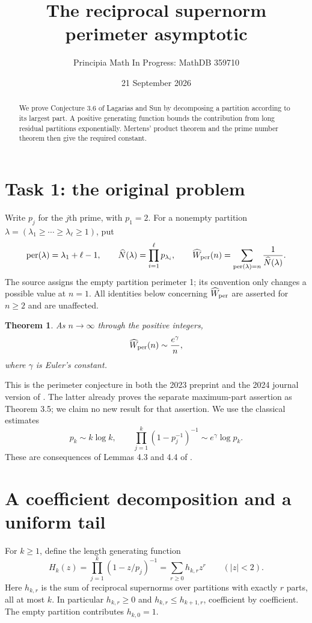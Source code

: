 \documentclass[11pt]{article}
\title{The reciprocal supernorm perimeter asymptotic}
\author{Principia Math In Progress: MathDB 359710}
\date{21 September 2026}
\newtheorem{theorem}{Theorem}
\newcommand{\Per}{\operatorname{per}}
\newcommand{\W}{\widehat W_{\rm per}}
\begin{document}
\maketitle
\begin{abstract}
We prove Conjecture 3.6 of Lagarias and Sun by decomposing a partition
according to its largest part. A positive generating function bounds the
contribution from long residual partitions exponentially. Mertens' product
theorem and the prime number theorem then give the required constant.
\end{abstract}

\section*{Task 1: the original problem}
Write $p_j$ for the $j$th prime, with $p_1=2$. For a nonempty partition
$\lambda=(\lambda_1\ge\cdots\ge\lambda_\ell\ge1)$, put
\[
 \Per(\lambda)=\lambda_1+\ell-1,
 \qquad \widehat N(\lambda)=\prod_{i=1}^\ell p_{\lambda_i},
 \qquad \W(n)=\sum_{\Per(\lambda)=n}\frac1{\widehat N(\lambda)}.
\]
The source assigns the empty partition perimeter 1; its convention only
changes a possible value at $n=1$. All identities below concerning $\W$
are asserted for $n\ge2$ and are unaffected.

\begin{theorem}\label{thm:main}
As $n\to\infty$ through the positive integers,
\[
                    \W(n)\sim\frac{e^\gamma}{n},
\]
where $\gamma$ is Euler's constant.
\end{theorem}

This is the perimeter conjecture in both the 2023 preprint and the 2024
journal version of \cite{LS}. The latter already proves the separate
maximum-part assertion as Theorem 3.5; we claim no new result for that
assertion. We use the classical estimates
\begin{equation}\label{eq:classical}
 p_k\sim k\log k,\qquad
 \prod_{j=1}^k(1-p_j^{-1})^{-1}\sim e^\gamma\log p_k.
\end{equation}
These are consequences of Lemmas 4.3 and 4.4 of \cite{LS}.

\section*{A coefficient decomposition and a uniform tail}
For $k\ge1$, define the length generating function
\begin{equation}\label{eq:H}
 H_k(z)=\prod_{j=1}^k(1-z/p_j)^{-1}
       =\sum_{r\ge0}h_{k,r}z^r\qquad (|z|<2).
\end{equation}
Here $h_{k,r}$ is the sum of reciprocal supernorms over partitions with
exactly $r$ parts, all at most $k$. In particular $h_{k,r}\ge0$ and
$h_{k,r}\le h_{k+1,r}$, coefficient by coefficient. The empty partition
contributes $h_{k,0}=1$.
\end{document}
